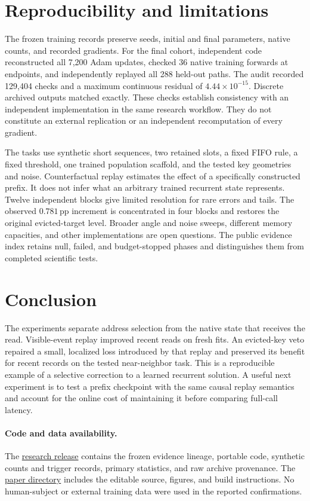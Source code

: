 \documentclass[10pt]{article}
\newcommand{\pp}{\,\mathrm{pp}}
\newcommand{\repo}{https://github.com/20171806011/Temporal-Attention-Neuron}
\begin{document}
\section{Reproducibility and limitations}
The frozen training records preserve seeds, initial and final parameters, native counts, and recorded gradients. For the final cohort, independent code reconstructed all 7,200 Adam updates, checked 36 native training forwards at endpoints, and independently replayed all 288 held-out paths. The audit recorded 129,404 checks and a maximum continuous residual of $4.44\times10^{-15}$. Discrete archived outputs matched exactly. These checks establish consistency with an independent implementation in the same research workflow. They do not constitute an external replication or an independent recomputation of every gradient.

The tasks use synthetic short sequences, two retained slots, a fixed FIFO rule, a fixed threshold, one trained population scaffold, and the tested key geometries and noise. Counterfactual replay estimates the effect of a specifically constructed prefix. It does not infer what an arbitrary trained recurrent state represents. Twelve independent blocks give limited resolution for rare errors and tails. The observed $0.781\pp$ increment is concentrated in four blocks and restores the original evicted-target level. Broader angle and noise sweeps, different memory capacities, and other implementations are open questions. The public evidence index retains null, failed, and budget-stopped phases and distinguishes them from completed scientific tests.

\section{Conclusion}
The experiments separate address selection from the native state that receives the read. Visible-event replay improved recent reads on fresh fits. An evicted-key veto repaired a small, localized loss introduced by that replay and preserved its benefit for recent records on the tested near-neighbor task. This is a reproducible example of a selective correction to a learned recurrent solution. A useful next experiment is to test a prefix checkpoint with the same causal replay semantics and account for the online cost of maintaining it before comparing full-call latency.

\paragraph{Code and data availability.}
The \href{\repo/tree/main/research/dend-tan-2026-11}{research release} contains the frozen evidence lineage, portable code, synthetic counts and trigger records, primary statistics, and raw archive provenance. The \href{\repo/tree/main/papers/dend-tan-event-replay-2026}{paper directory} includes the editable source, figures, and build instructions. No human-subject or external training data were used in the reported confirmations.
\end{document}
